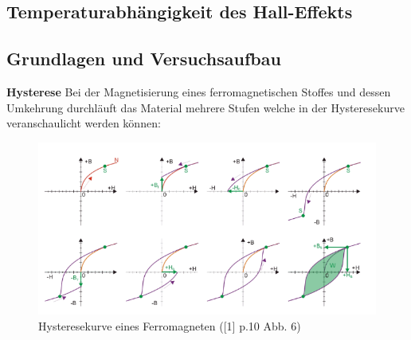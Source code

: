 \documentclass[12pt,a4paper]{article}
\begin{document}
\begin{multicols}{2}




%			




\section{Temperaturabhängigkeit des Hall-Effekts}

\subsection{Grundlagen und Versuchsaufbau}

\textbf{Hysterese}
Bei der Magnetisierung eines ferromagnetischen Stoffes und dessen Umkehrung durchläuft das Material mehrere Stufen welche in der Hysteresekurve veranschaulicht werden können:

\begin{figure}[H]
	\centering
	\includegraphics[scale=0.3]{./figures/hysterese.png}
	\caption{Hysteresekurve eines Ferromagneten ([1] p.10 Abb. 6)}
	\label{fig:hysterese}
\end{figure}


\end{multicols}
\end{document}
